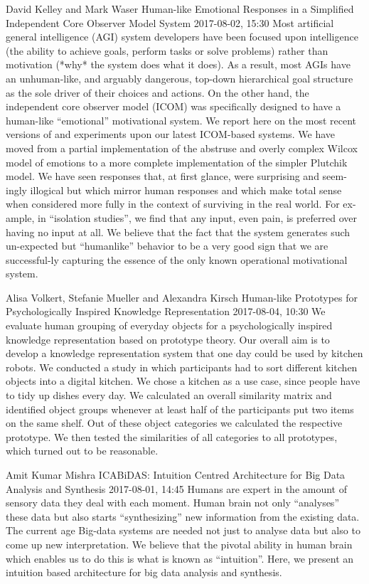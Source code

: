 \documentclass[10pt,fleqn,openany]{book} %
\begin{document}
\begin{enumerate}
		
		\paperabstract
		{David Kelley and Mark Waser}
		{Human-like Emotional Responses in a Simplified Independent Core Observer Model System}
		{2017-08-02, 15:30}
		{Most artificial general intelligence (AGI) system developers have been focused upon intelligence (the ability to achieve goals, perform tasks or solve problems) rather than motivation (*why* the system does what it does).  As a result, most AGIs have an unhuman-like, and arguably dangerous, top-down hierarchical goal structure as the sole driver of their choices and actions.  On the other hand, the independent core observer model (ICOM) was specifically designed to have a human-like ``emotional'' motivational system.  We report here on the most recent versions of and experiments upon our latest ICOM-based systems.  We have moved from a partial implementation of the abstruse and overly complex Wilcox model of emotions to a more complete implementation of the simpler Plutchik model.  We have seen responses that, at first glance, were surprising and seem-ingly illogical  but which mirror human responses and which make total sense when considered more fully in the context of surviving in the real world.  For ex-ample, in ``isolation studies'', we find that any input, even pain, is preferred over having no input at all.  We believe that the fact that the system generates such un-expected but ``humanlike'' behavior to be a very good sign that we are successful-ly capturing the essence of the only known operational motivational system.}
		
		
		\paperabstract
		{Alisa Volkert, Stefanie Mueller and Alexandra Kirsch}
		{Human-like Prototypes for Psychologically Inspired Knowledge Representation}
		{2017-08-04, 10:30}
		{We evaluate human grouping of everyday objects for a psychologically inspired knowledge representation based on prototype theory. Our overall aim is to develop a knowledge representation system that one day could be used by kitchen robots. We conducted a study in which participants had to sort different kitchen objects into a digital kitchen. We chose a kitchen as a use case, since people have to tidy up dishes every day. We calculated an overall similarity matrix and identified object groups whenever at least half of the participants put two items on the same shelf. Out of these object categories we calculated the respective prototype. We then tested the similarities of all categories to all prototypes, which turned out to be reasonable.}
		
		
		\paperabstract
		{Amit Kumar Mishra}
		{ICABiDAS: Intuition Centred Architecture for Big Data Analysis and Synthesis}
		{2017-08-01, 14:45}
		{Humans are expert in the amount of sensory data they deal with each moment. Human brain not only ``analyses'' these data but also starts ``synthesizing'' new information from the existing data. The current age Big-data systems are needed not just to analyse data but also to come up new interpretation. We believe that the pivotal ability in human brain which enables us to do this is what is known as ``intuition''. Here, we present an intuition based architecture for big data analysis and synthesis.}
		

\end{enumerate}
\end{document}
